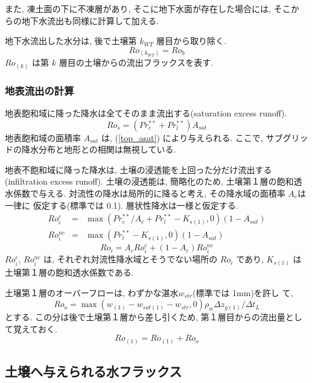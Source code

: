 また, 凍土面の下に不凍層があり, そこに地下水面が存在した場合には, そこか
らの地下水流出も同様に計算して加える. 

地下水流出した水分は, 後で土壌第 $k_{WT}$ 層目から取り除く. 
\begin{equation}
 Ro_{(k_{WT})} = Ro_b
\end{equation}
$Ro_{(k)}$ は第 $k$ 層目の土壌からの流出フラックスを表す. 


\subsubsection{地表流出の計算}

地表飽和域に降った降水は全てそのまま流出する(saturation excess runoff). 
\begin{equation}
 Ro_s = (Pr_c^{**} + Pr_l^{**}) A_{sat}
\end{equation}
地表飽和域の面積率 $A_{sat}$ は, (\ref{top_asat}) により与えられる. 
ここで, サブグリッドの降水分布と地形との相関は無視している. 

地表不飽和域に降った降水は, 土壌の浸透能を上回った分だけ流出する
(infiltration excess runoff). 
土壌の浸透能は, 簡略化のため, 土壌第１層の飽和透水係数で与える. 
対流性の降水は局所的に降ると考え, その降水域の面積率 $A_c$は一律に
仮定する(標準では 0.1). 層状性降水は一様と仮定する. 
\begin{eqnarray}
 Ro_i^c &=& \max( Pr_c^{**}/A_c + Pr_l^{**} - K_{s(1)}, 0 ) (1 - A_{sat}) \\
 Ro_i^{nc} &=& \max( Pr_l^{**} - K_{s(1)}, 0 ) (1 - A_{sat})
\end{eqnarray}
\begin{equation}
 Ro_i = A_c Ro_i^c + ( 1 - A_c ) Ro_i^{nc}
\end{equation}
$Ro_i^c$, $Ro_i^{nc}$ は, それぞれ対流性降水域とそうでない場所の $Ro_i$
であり, $K_{s(1)}$ は土壌第１層の飽和透水係数である. 

土壌第１層のオーバーフローは, わずかな湛水$w_{str}$(標準では 1mm)を許し
て, 
\begin{equation}
 Ro_o = \max(w_{(1)} - w_{sat(1)} - w_{str}, 0) \rho_w \Delta z_{g(1)} / \Delta t_L
\end{equation}
とする. この分は後で土壌第１層から差し引くため, 第１層目からの流出量とし
て覚えておく. 
\begin{equation}
 Ro_{(1)} = Ro_{(1)} + Ro_o
\end{equation}

\subsection{土壌へ与えられる水フラックス}

